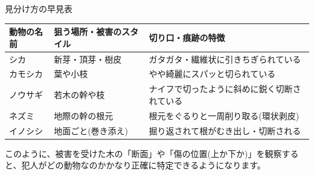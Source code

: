 \documentclass[a4paper, 11pt]{jsarticle}
\begin{document}
見分け方の早見表
\begin{table}[htbp]
\centering
\begin{tabularx}{\textwidth}{lXX}
\toprule
動物の名前 & 狙う場所・被害のスタイル & 切り口・痕跡の特徴 \\
\midrule
シカ & 新芽・頂芽・樹皮 & ガタガタ・繊維状に引きちぎられている \\
カモシカ & 葉や小枝 & やや綺麗にスパッと切られている \\
ノウサギ & 若木の幹や枝 & ナイフで切ったように斜めに鋭く切断されている \\
ネズミ & 地際の幹の根元 & 根元をぐるりと一周削り取る(環状剥皮) \\
イノシシ & 地面ごと(巻き添え) & 掘り返されて根がむき出し・切断される \\
\bottomrule
\end{tabularx}
\end{table}
このように、被害を受けた木の「断面」や「傷の位置(上か下か)」を観察すると、犯人がどの動物なのかかなり正確に特定できるようになります。
\end{document}
